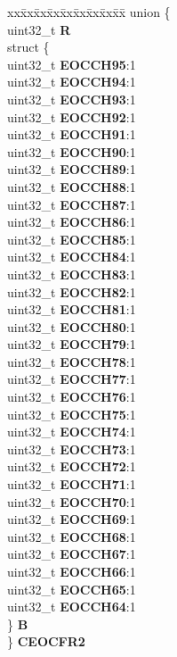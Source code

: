 \begin{DoxyCompactItemize}
\begin{tabbing}
\end{tabbing}\item 
\mbox{\label{structADC__tag_a081b646e2b16a7abf1b8f1f741558e13}} 
\begin{tabbing}
xx\=xx\=xx\=xx\=xx\=xx\=xx\=xx\=xx\=\kill
union \{\\
\>uint32\_t {\bfseries R}\\
\>struct \{\\
\>\>uint32\_t {\bfseries EOCCH95}:1\\
\>\>uint32\_t {\bfseries EOCCH94}:1\\
\>\>uint32\_t {\bfseries EOCCH93}:1\\
\>\>uint32\_t {\bfseries EOCCH92}:1\\
\>\>uint32\_t {\bfseries EOCCH91}:1\\
\>\>uint32\_t {\bfseries EOCCH90}:1\\
\>\>uint32\_t {\bfseries EOCCH89}:1\\
\>\>uint32\_t {\bfseries EOCCH88}:1\\
\>\>uint32\_t {\bfseries EOCCH87}:1\\
\>\>uint32\_t {\bfseries EOCCH86}:1\\
\>\>uint32\_t {\bfseries EOCCH85}:1\\
\>\>uint32\_t {\bfseries EOCCH84}:1\\
\>\>uint32\_t {\bfseries EOCCH83}:1\\
\>\>uint32\_t {\bfseries EOCCH82}:1\\
\>\>uint32\_t {\bfseries EOCCH81}:1\\
\>\>uint32\_t {\bfseries EOCCH80}:1\\
\>\>uint32\_t {\bfseries EOCCH79}:1\\
\>\>uint32\_t {\bfseries EOCCH78}:1\\
\>\>uint32\_t {\bfseries EOCCH77}:1\\
\>\>uint32\_t {\bfseries EOCCH76}:1\\
\>\>uint32\_t {\bfseries EOCCH75}:1\\
\>\>uint32\_t {\bfseries EOCCH74}:1\\
\>\>uint32\_t {\bfseries EOCCH73}:1\\
\>\>uint32\_t {\bfseries EOCCH72}:1\\
\>\>uint32\_t {\bfseries EOCCH71}:1\\
\>\>uint32\_t {\bfseries EOCCH70}:1\\
\>\>uint32\_t {\bfseries EOCCH69}:1\\
\>\>uint32\_t {\bfseries EOCCH68}:1\\
\>\>uint32\_t {\bfseries EOCCH67}:1\\
\>\>uint32\_t {\bfseries EOCCH66}:1\\
\>\>uint32\_t {\bfseries EOCCH65}:1\\
\>\>uint32\_t {\bfseries EOCCH64}:1\\
\>\} {\bfseries B}\\
\} {\bfseries CEOCFR2}\\


\end{tabbing}
\end{DoxyCompactItemize}
